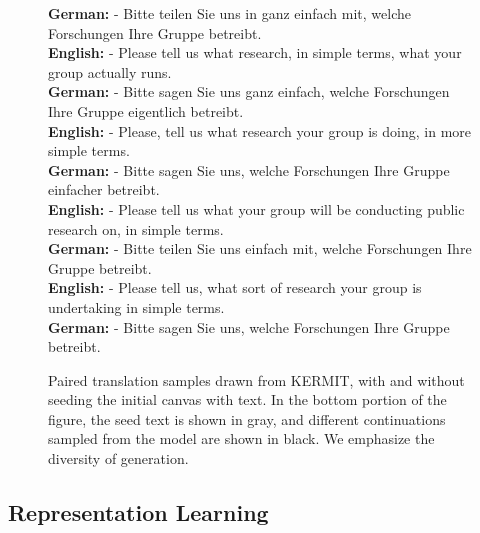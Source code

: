 \documentclass{article}
\newcommand{\gray}[1]{{\color{gray}#1}}
\newcommand{\black}[1]{{\color{black}#1}}
\begin{document}
\begin{figure*}[t]
\begin{flushleft}
\textbf{German:} \black{- Bitte teilen Sie uns in ganz einfach mit,} \gray{welche Forschungen Ihre Gruppe betreibt.} \\
\vspace{0.5em}
\textbf{English:} \gray{- Please tell us} \black{what research}\gray{, in simple terms}\black{, what your group actually runs.} \\
\textbf{German: } \black{- Bitte sagen Sie uns ganz einfach,} \gray{welche Forschungen Ihre Gruppe} \black{eigentlich} \gray{betreibt.} \\
\vspace{0.5em}
\textbf{English: } \gray{- Please}\black{,} \gray{tell us} \black{what research your group is doing}\gray{, in} \black{more} \gray{simple terms}\black{.} \\
\textbf{German: } \black{- Bitte sagen Sie uns,} \gray{welche Forschungen Ihre Gruppe} \black{einfacher} \gray{betreibt.} \\
\vspace{0.5em}
\textbf{English: } \gray{- Please tell us} \black{what your group will be conducting public research on}\gray{, in simple terms}\black{.} \\
\textbf{German: } \black{- Bitte teilen Sie uns einfach mit,} \gray{welche Forschungen Ihre Gruppe betreibt.} \\
\vspace{0.5em}
\textbf{English: } \gray{- Please tell us,} \black{what sort of research your group is undertaking} \gray{in simple terms}\black{.} \\
\textbf{German: } \black{- Bitte sagen Sie uns,} \gray{welche Forschungen Ihre Gruppe betreibt.}\end{flushleft}
\vspace{-0.25em}
\parbox{\textwidth}{\dotfill}
\caption{Paired translation samples drawn from KERMIT, with and without seeding the initial canvas with text. In the bottom portion of the figure, the seed text is shown in gray, and different continuations sampled from the model are shown in black. We emphasize the diversity of generation.}
\label{fig:mt_samples}
\end{figure*} 


\subsection{Representation Learning}
\label{sec:representationlearning}
\end{document}
